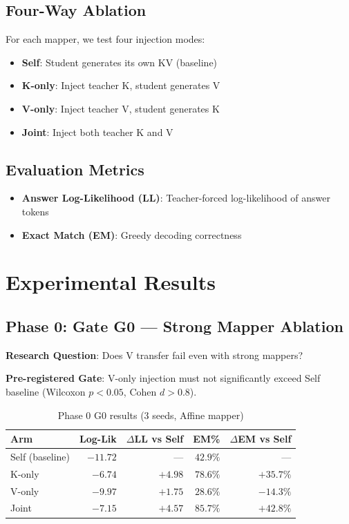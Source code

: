 \documentclass[11pt]{article}
\begin{document}
\subsection{Four-Way Ablation}

For each mapper, we test four injection modes:
\begin{itemize}
    \item \textbf{Self}: Student generates its own KV (baseline)
    \item \textbf{K-only}: Inject teacher K, student generates V
    \item \textbf{V-only}: Inject teacher V, student generates K
    \item \textbf{Joint}: Inject both teacher K and V
\end{itemize}

\subsection{Evaluation Metrics}

\begin{itemize}
    \item \textbf{Answer Log-Likelihood (LL)}: Teacher-forced log-likelihood of answer tokens
    \item \textbf{Exact Match (EM)}: Greedy decoding correctness
\end{itemize}

\section{Experimental Results}

\subsection{Phase 0: Gate G0 --- Strong Mapper Ablation}

\textbf{Research Question}: Does V transfer fail even with strong mappers?

\textbf{Pre-registered Gate}: V-only injection must not significantly exceed Self baseline (Wilcoxon $p < 0.05$, Cohen $d > 0.8$).

\begin{table}[h]
\centering
\caption{Phase 0 G0 results (3 seeds, Affine mapper)}
\begin{tabular}{lrrrr}
\toprule
Arm & Log-Lik & $\Delta$LL vs Self & EM\% & $\Delta$EM vs Self \\
\midrule
Self (baseline) & $-11.72$ & --- & $42.9\%$ & --- \\
K-only & $\mathbf{-6.74}$ & $+\mathbf{4.98}$ & $\mathbf{78.6\%}$ & $+\mathbf{35.7\%}$ \\
V-only & $-9.97$ & $+1.75$ & $28.6\%$ & $-14.3\%$ \\
Joint & $-7.15$ & $+4.57$ & $85.7\%$ & $+42.8\%$ \\
\bottomrule
\end{tabular}
\end{table}
\end{document}
